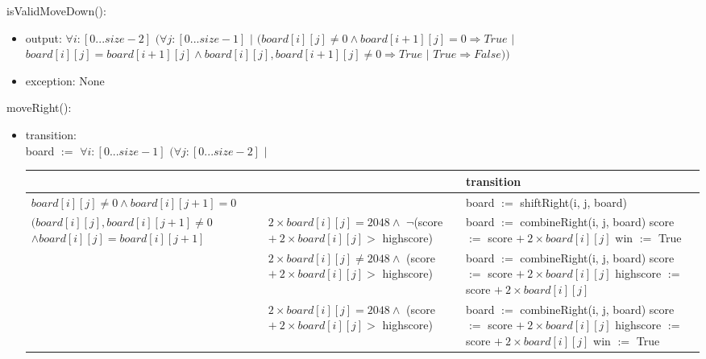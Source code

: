 \documentclass[12pt]{article}
\begin{document}
\noindent isValidMoveDown():
\begin{itemize}
\item output: $\forall i : [0...size-2]$ $(\forall j : [0...size-1]$ $|$ $(board[i][j] \ne 0 \land board[i+1][j]=0 \Rightarrow True$ $|$ $board[i][j] = board[i+1][j] \land board[i][j], board[i+1][j] \ne 0 \Rightarrow True$ $|$ $True \Rightarrow False))$
\item exception: None
\end{itemize}

\noindent moveRight():
\begin{itemize}
\item transition:\\ 
board $:=$ $\forall i : [0...size-1]$ $(\forall j : [0...size-2]$ $|$
\begin{table}[hbt!]
\centering
\begin{tabular}{|l|l|l|}
\cline{3-3}
\multicolumn{1}{l}{} &  & transition \\
\hline
\multicolumn{2}{|l|}{$board[i][j] \ne 0 \land board[i][j+1] = 0$} & board $:=$ shiftRight(i, j, board)\\
\hline
\shortstack{$(board[i][j], board[i][j+1] \ne 0$ \\$\land board[i][j] = board[i][j+1]$} & \shortstack{$2\times board[i][j] = 2048 \land$ \\ $\neg$(score $+ \: 2\times board[i][j] > $ highscore) } & \shortstack{board $:=$ combineRight(i, j, board)\\ score $:=$ score $+\: 2\times board[i][j]$\\ win $:=$ True}\\
\cline{2-3}
 & \shortstack{$2\times board[i][j] \ne 2048 \land$ \\ (score $+ \: 2\times board[i][j] > $ highscore) } & \shortstack{board $:=$ combineRight(i, j, board)\\ score $:=$ score $+\: 2\times board[i][j]$\\ highscore $:=$ score $+\: 2\times board[i][j]$}\\
\cline{2-3}
  & \shortstack{$2\times board[i][j] = 2048 \land$ \\ (score $+ \: 2\times board[i][j] > $ highscore) }  & \shortstack{board $:=$ combineRight(i, j, board)\\ score $:=$ score $+\: 2\times board[i][j]$\\ highscore $:=$ score $+\: 2\times board[i][j]$\\ win $:=$ True}\\
\cline{2-3}

\end{tabular}
\end{table}
\end{itemize}
\end{document}
